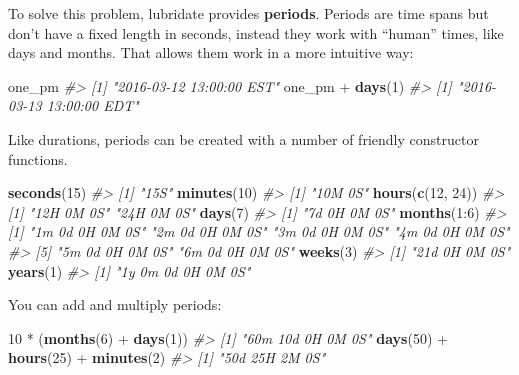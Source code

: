 \documentclass[]{book}
\newenvironment{Shaded}{\begin{snugshade}}{\end{snugshade}}
\newcommand{\KeywordTok}[1]{\textcolor[rgb]{0.13,0.29,0.53}{\textbf{{#1}}}}
\newcommand{\DecValTok}[1]{\textcolor[rgb]{0.00,0.00,0.81}{{#1}}}
\newcommand{\StringTok}[1]{\textcolor[rgb]{0.31,0.60,0.02}{{#1}}}
\newcommand{\CommentTok}[1]{\textcolor[rgb]{0.56,0.35,0.01}{\textit{{#1}}}}
\newcommand{\NormalTok}[1]{{#1}}
\begin{document}
To solve this problem, lubridate provides \textbf{periods}. Periods are
time spans but don't have a fixed length in seconds, instead they work
with ``human'' times, like days and months. That allows them work in a
more intuitive way:

\begin{Shaded}
\begin{Highlighting}[]
\NormalTok{one_pm}
\CommentTok{#> [1] "2016-03-12 13:00:00 EST"}
\NormalTok{one_pm +}\StringTok{ }\KeywordTok{days}\NormalTok{(}\DecValTok{1}\NormalTok{)}
\CommentTok{#> [1] "2016-03-13 13:00:00 EDT"}
\end{Highlighting}
\end{Shaded}

Like durations, periods can be created with a number of friendly
constructor functions.

\begin{Shaded}
\begin{Highlighting}[]
\KeywordTok{seconds}\NormalTok{(}\DecValTok{15}\NormalTok{)}
\CommentTok{#> [1] "15S"}
\KeywordTok{minutes}\NormalTok{(}\DecValTok{10}\NormalTok{)}
\CommentTok{#> [1] "10M 0S"}
\KeywordTok{hours}\NormalTok{(}\KeywordTok{c}\NormalTok{(}\DecValTok{12}\NormalTok{, }\DecValTok{24}\NormalTok{))}
\CommentTok{#> [1] "12H 0M 0S" "24H 0M 0S"}
\KeywordTok{days}\NormalTok{(}\DecValTok{7}\NormalTok{)}
\CommentTok{#> [1] "7d 0H 0M 0S"}
\KeywordTok{months}\NormalTok{(}\DecValTok{1}\NormalTok{:}\DecValTok{6}\NormalTok{)}
\CommentTok{#> [1] "1m 0d 0H 0M 0S" "2m 0d 0H 0M 0S" "3m 0d 0H 0M 0S" "4m 0d 0H 0M 0S"}
\CommentTok{#> [5] "5m 0d 0H 0M 0S" "6m 0d 0H 0M 0S"}
\KeywordTok{weeks}\NormalTok{(}\DecValTok{3}\NormalTok{)}
\CommentTok{#> [1] "21d 0H 0M 0S"}
\KeywordTok{years}\NormalTok{(}\DecValTok{1}\NormalTok{)}
\CommentTok{#> [1] "1y 0m 0d 0H 0M 0S"}
\end{Highlighting}
\end{Shaded}

You can add and multiply periods:

\begin{Shaded}
\begin{Highlighting}[]
\DecValTok{10} \NormalTok{*}\StringTok{ }\NormalTok{(}\KeywordTok{months}\NormalTok{(}\DecValTok{6}\NormalTok{) +}\StringTok{ }\KeywordTok{days}\NormalTok{(}\DecValTok{1}\NormalTok{))}
\CommentTok{#> [1] "60m 10d 0H 0M 0S"}
\KeywordTok{days}\NormalTok{(}\DecValTok{50}\NormalTok{) +}\StringTok{ }\KeywordTok{hours}\NormalTok{(}\DecValTok{25}\NormalTok{) +}\StringTok{ }\KeywordTok{minutes}\NormalTok{(}\DecValTok{2}\NormalTok{)}
\CommentTok{#> [1] "50d 25H 2M 0S"}
\end{Highlighting}
\end{Shaded}
\end{document}
